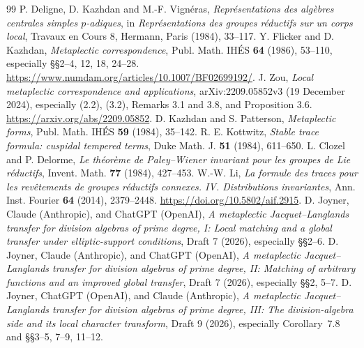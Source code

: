 \documentclass[11pt]{article}
\theoremstyle{plain}
\theoremstyle{definition}
\begin{document}
\begin{thebibliography}{99}
 P. Deligne, D. Kazhdan and M.-F. Vign\'eras,
\emph{Repr\'esentations des alg\`ebres centrales simples $p$-adiques},
in \emph{Repr\'esentations des groupes r\'eductifs sur un corps local},
Travaux en Cours 8, Hermann, Paris (1984), 33--117.
 Y. Flicker and D. Kazhdan,
\emph{Metaplectic correspondence}, Publ. Math. IH\'ES \textbf{64}
(1986), 53--110, especially \S\S2--4, 12, 18, 24--28.
\url{https://www.numdam.org/articles/10.1007/BF02699192/}.
 J. Zou,
\emph{Local metaplectic correspondence and applications},
arXiv:2209.05852v3 (19 December 2024), especially
(2.2), (3.2), Remarks 3.1 and 3.8, and Proposition 3.6.
\url{https://arxiv.org/abs/2209.05852}.
 D. Kazhdan and S. Patterson,
\emph{Metaplectic forms}, Publ. Math. IH\'ES \textbf{59}
(1984), 35--142.
 R. E. Kottwitz,
\emph{Stable trace formula: cuspidal tempered terms}, Duke Math. J.
\textbf{51} (1984), 611--650.
 L. Clozel and P. Delorme,
\emph{Le th\'eor\`eme de Paley--Wiener invariant pour les groupes de Lie
r\'eductifs}, Invent. Math. \textbf{77} (1984), 427--453.
 W.-W. Li,
\emph{La formule des traces pour les rev\^etements de groupes
r\'eductifs connexes. IV. Distributions invariantes},
Ann. Inst. Fourier \textbf{64} (2014), 2379--2448.
\url{https://doi.org/10.5802/aif.2915}.
 D. Joyner, Claude (Anthropic), and ChatGPT (OpenAI),
\emph{A metaplectic Jacquet--Langlands transfer for division algebras
of prime degree, I: Local matching and a global transfer under
elliptic-support conditions}, Draft 7 (2026), especially \S\S2--6.
 D. Joyner, Claude (Anthropic), and ChatGPT (OpenAI),
\emph{A metaplectic Jacquet--Langlands transfer for division algebras
of prime degree, II: Matching of arbitrary functions and an improved
global transfer}, Draft 7 (2026), especially \S\S2, 5--7.
 D. Joyner, ChatGPT (OpenAI), and Claude (Anthropic),
\emph{A metaplectic Jacquet--Langlands transfer for division algebras
of prime degree, III: The division-algebra side and its local
character transform}, Draft 9 (2026), especially Corollary~7.8
and \S\S3--5, 7--9, 11--12.
\end{thebibliography}
\end{document}
